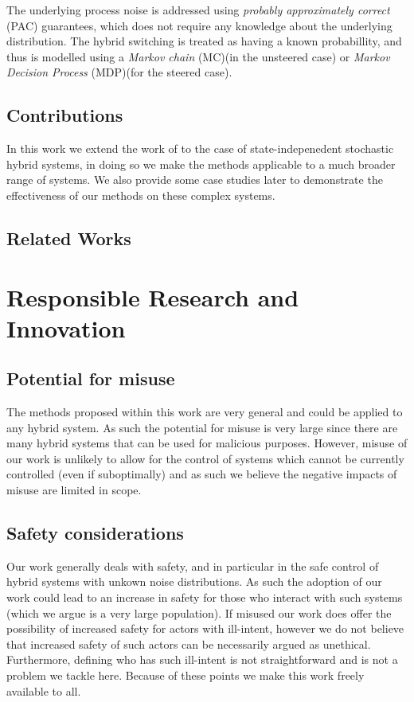 \documentclass[twoside,twocolumn]{article}
\begin{document}
The underlying process noise is addressed using \emph{probably approximately correct} (PAC) guarantees, which does not require any knowledge about the underlying distribution.
The hybrid switching is treated as having a known probabillity, and thus is modelled using a \emph{Markov chain} (MC)(in the unsteered case) or \emph{Markov Decision Process} (MDP)(for the steered case).

\subsection{Contributions}

In this work we extend the work of \cite{} to the case of state-indepenedent stochastic hybrid systems, in doing so we make the methods applicable to a much broader range of systems. We also provide some case studies later to demonstrate the effectiveness of our methods on these complex systems.

\subsection{Related Works}

\section{Responsible Research and Innovation}

\subsection{Potential for misuse}

The methods proposed within this work are very general and could be applied to any hybrid system. As such the potential for misuse is very large since there are many hybrid systems that can be used for malicious purposes. However, misuse of our work is unlikely to allow for the control of systems which cannot be currently controlled (even if suboptimally) and as such we believe the negative impacts of misuse are limited in scope.

\subsection{Safety considerations}

Our work generally deals with safety, and in particular in the safe control of hybrid systems with unkown noise distributions. As such the adoption of our work could lead to an increase in safety for those who interact with such systems (which we argue is a very large population). If misused our work does offer the possibility of increased safety for actors with ill-intent, however we do not believe that increased safety of such actors can be necessarily argued as unethical. Furthermore, defining who has such ill-intent is not straightforward and is not a problem we tackle here. Because of these points we make this work freely available to all.
\end{document}
